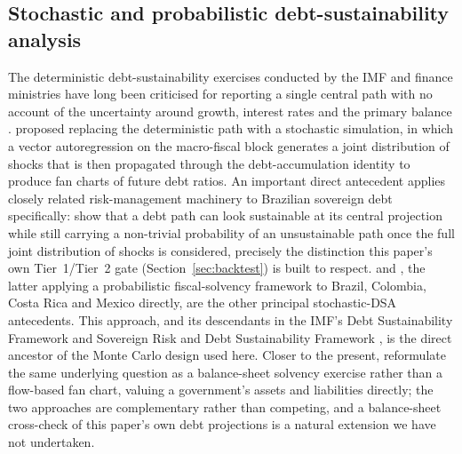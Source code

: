 \documentclass[11pt,a4paper]{article}
\begin{document}
\subsection{Stochastic and probabilistic debt-sustainability analysis}
\label{sec:lit-dsa}

The deterministic debt-sustainability exercises conducted by the IMF and finance ministries have long been criticised for reporting a single central path with no account of the uncertainty around growth, interest rates and the primary balance \citep{imf2003dsa}. \citet{celasundebrunostry2007} proposed replacing the deterministic path with a stochastic simulation, in which a vector autoregression on the macro-fiscal block generates a joint distribution of shocks that is then propagated through the debt-accumulation identity to produce fan charts of future debt ratios. An important direct antecedent applies closely related risk-management machinery to Brazilian sovereign debt specifically: \citet{garciarigobon2004} show that a debt path can look sustainable at its central projection while still carrying a non-trivial probability of an unsustainable path once the full joint distribution of shocks is considered, precisely the distinction this paper's own Tier~1/Tier~2 gate (Section~\ref{sec:backtest}) is built to respect. \citet{karamhostland2005,karamhostland2006} and \citet{mendozaoviedo2004}, the latter applying a probabilistic fiscal-solvency framework to Brazil, Colombia, Costa Rica and Mexico directly, are the other principal stochastic-DSA antecedents. This approach, and its descendants in the IMF's Debt Sustainability Framework \citep{imf2013mac} and Sovereign Risk and Debt Sustainability Framework \citep{imf2022srdsf}, is the direct ancestor of the Monte Carlo design used here. Closer to the present, \citet{levyyeyatisturzenegger2023} reformulate the same underlying question as a balance-sheet solvency exercise rather than a flow-based fan chart, valuing a government's assets and liabilities directly; the two approaches are complementary rather than competing, and a balance-sheet cross-check of this paper's own debt projections is a natural extension we have not undertaken.
\end{document}
